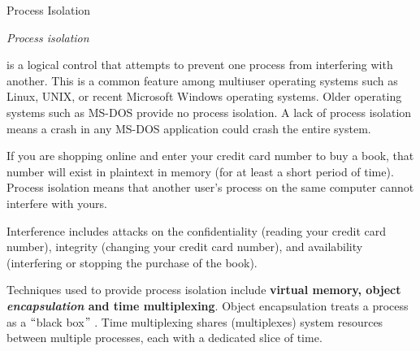 \documentclass[12pt]{article}
\begin{document}
\begin{adjustwidth}{0.25in}{0.0in}
{\fontsize{18pt}{21.6pt}\selectfont Process Isolation\par}\par

\end{adjustwidth}

\begin{adjustwidth}{0.25in}{0.0in}
{\fontsize{18pt}{21.6pt}\selectfont \textit{Process isolation} {\fontsize{16pt}{19.2pt}\selectfont is a logical control that attempts to prevent one process from interfering with another. This is a common feature among multiuser operating systems such as Linux, UNIX, or recent Microsoft Windows operating systems. Older operating systems such as MS-DOS provide no process isolation. A lack of process isolation means a crash in any MS-DOS application could crash the entire system.\par}\par}\par

\end{adjustwidth}

\begin{adjustwidth}{0.25in}{0.0in}
{\fontsize{16pt}{19.2pt}\selectfont If you are shopping online and enter your credit card number to buy a book, that number will exist in plaintext in memory (for at least a short period of time). Process isolation means that another user’s process on the same computer cannot interfere with yours.\par}\par

\end{adjustwidth}

\begin{adjustwidth}{0.25in}{0.0in}
{\fontsize{16pt}{19.2pt}\selectfont Interference includes attacks on the confidentiality (reading your credit card number), integrity (changing your credit card number), and availability (interfering or stopping the purchase of the book).\par}\par

\end{adjustwidth}

\begin{adjustwidth}{0.25in}{0.0in}
{\fontsize{16pt}{19.2pt}\selectfont Techniques used to provide process isolation include \textbf{virtual memory, object \textit{encapsulation} and time multiplexing}. Object encapsulation treats a process as a $``$black box$"$ . Time multiplexing shares (multiplexes) system resources between multiple processes, each with a dedicated slice of time.\par}\par

\end{adjustwidth}
\end{document}
